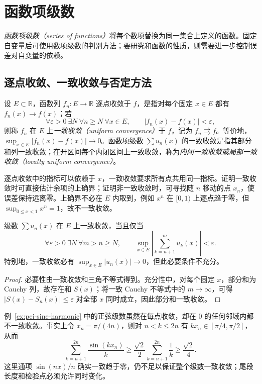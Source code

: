 \section{函数项级数}
\label{sec:pei-function-series}

\emph{函数项级数（series of functions）}将每个数项替换为同一集合上定义的函数。固定自变量后可使用数项级数的判别方法；要研究和函数的性质，则需要进一步控制误差对自变量的依赖。

\subsection{逐点收敛、一致收敛与否定方法}

\begin{definition}
设 $E\subset\mathbb R$，函数列 $f_n:E\to\mathbb R$ 逐点收敛于 $f$，是指对每个固定 $x\in E$ 都有 $f_n(x)\to f(x)$；若
\[
 \forall\varepsilon>0\ \exists N\ \forall n\geq N\ \forall x\in E,
 \qquad |f_n(x)-f(x)|<\varepsilon,
\]
则称 $f_n$ 在 $E$ 上\emph{一致收敛（uniform convergence）}于 $f$，记为 $f_n\rightrightarrows f$。等价地，$\sup_{x\in E}|f_n(x)-f(x)|\to0$。函数项级数 $\sum u_n(x)$ 的一致收敛是指其部分和列一致收敛；在开区间每个内闭区间上一致收敛，称为\emph{内闭一致收敛或局部一致收敛（locally uniform convergence）}。
\end{definition}

逐点收敛中的指标可以依赖于 $x$，一致收敛要求所有点共用同一指标。证明一致收敛时可直接估计余项的上确界；证明非一致收敛时，可寻找随 $n$ 移动的点 $x_n$，使误差保持远离零。上确界不必在 $E$ 内取到，例如 $x^n$ 在 $[0,1)$ 上逐点趋于零，但 $\sup_{0\leq x<1}x^n=1$，故不一致收敛。

\begin{theorem}[一致 Cauchy 准则]
\label{thm:pei-uniform-cauchy}
级数 $\sum u_n(x)$ 在 $E$ 上一致收敛，当且仅当
\[
 \forall\varepsilon>0\ \exists N\ \forall m>n\geq N,
 \qquad\sup_{x\in E}\left|\sum_{k=n+1}^{m}u_k(x)\right|<\varepsilon.
\]
特别地，一致收敛必有 $\sup_{x\in E}|u_n(x)|\to0$，但此必要条件不充分。
\end{theorem}
\begin{proof}
必要性由一致收敛和三角不等式得到。充分性中，对每个固定 $x$，部分和为 Cauchy 列，故存在和 $S(x)$；将一致 Cauchy 不等式中的 $m\to\infty$，可得 $|S(x)-S_n(x)|\leq\varepsilon$ 对全部 $x$ 同时成立，因此部分和一致收敛。
\end{proof}

例~\ref{ex:pei-sine-harmonic} 中的正弦级数虽然在每点收敛，却在 $0$ 的任何邻域内都不一致收敛。事实上令 $x_n=\pi/(4n)$，则对 $n<k\leq2n$ 有 $kx_n\in[\pi/4,\pi/2]$，从而
\[
 \sum_{k=n+1}^{2n}\frac{\sin(kx_n)}k
 \geq\frac{\sqrt2}{2}\sum_{k=n+1}^{2n}\frac1k
 \geq\frac{\sqrt2}{4}.
\]
这里通项 $\sin(nx)/n$ 确实一致趋于零，仍不足以保证整个级数一致收敛；尾段长度和检验点必须允许同时变化。

